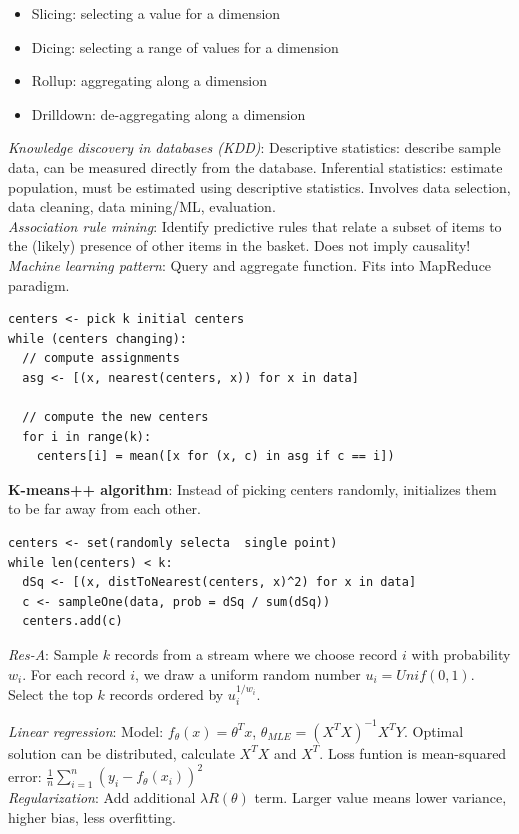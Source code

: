 \documentclass[10pt,landscape]{article}
\begin{document}
\begin{multicols}{3}
\begin{itemize}
  \item Slicing: selecting a value for a dimension
  \item Dicing: selecting a range of values for a dimension
  \item Rollup: aggregating along a dimension
  \item Drilldown: de-aggregating along a dimension
\end{itemize}

\textit{Knowledge discovery in databases (KDD)}: Descriptive statistics: describe sample data, can be measured directly from the database. Inferential statistics: estimate population, must be estimated using descriptive statistics. Involves data selection, data cleaning, data mining/ML, evaluation. \\
\textit{Association rule mining}: Identify predictive rules that relate a subset of items to the (likely) presence of other items in the basket. Does not imply causality! \\
\textit{Machine learning pattern}: Query and aggregate function. Fits into MapReduce paradigm.


\begin{verbatim}
centers <- pick k initial centers
while (centers changing):
  // compute assignments
  asg <- [(x, nearest(centers, x)) for x in data]

  // compute the new centers
  for i in range(k):
    centers[i] = mean([x for (x, c) in asg if c == i])
\end{verbatim}


\textbf{K-means++ algorithm}: Instead of picking centers randomly, initializes them to be far away from each other.

\begin{verbatim}
centers <- set(randomly selecta  single point)
while len(centers) < k:
  dSq <- [(x, distToNearest(centers, x)^2) for x in data]
  c <- sampleOne(data, prob = dSq / sum(dSq))
  centers.add(c)
\end{verbatim}

\textit{Res-A}: Sample $k$ records from a stream where we choose record $i$ with probability $w_i$. For each record $i$, we draw a uniform random number $u_i = Unif(0, 1)$. Select the top $k$ records ordered by $u_i^{1 / w_i}$.

\textit{Linear regression}: Model: $f_{\theta}(x) = \theta^T x$, $\theta_{MLE} = (X^T X)^{-1}X^T Y$. Optimal solution can be distributed, calculate $X^T X$ and $X^T$. Loss funtion is mean-squared error: $\frac{1}{n}\sum_{i=1}^n (y_i - f_{\theta}(x_i))^2$ \\
\textit{Regularization}: Add additional $\lambda R(\theta)$ term. Larger value means lower variance, higher bias, less overfitting.



\end{multicols}
\end{document}
